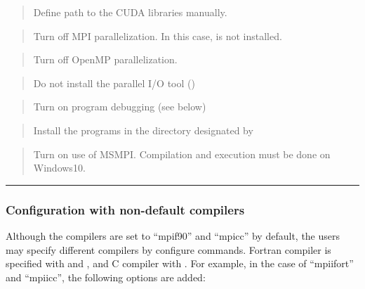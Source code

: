 \documentclass[a4paper,11pt,oneside,english]{sphinxmanual}
\begin{document}
\begin{quote}

Define path to the CUDA libraries manually.
\end{quote}

\begin{quote}

Turn off MPI parallelization. In this case,  is not installed.
\end{quote}

\begin{quote}

Turn off OpenMP parallelization.
\end{quote}

\begin{quote}

Do not install the parallel I/O tool ()
\end{quote}

\begin{quote}

Turn on program debugging (see below)
\end{quote}

\begin{quote}

Install the programs in the directory designated by 
\end{quote}

\begin{quote}

Turn on use of MSMPI. Compilation and execution must be done on Windows10.
\end{quote}


\bigskip\hrule\bigskip



\subsubsection{Configuration with non-default compilers}
\label{\detokenize{01_Getting_Started:configuration-with-non-default-compilers}}
Although the compilers are set to “mpif90” and “mpicc” by default,
the users may specify different compilers by configure commands.
Fortran compiler is specified with  and , and C compiler with .
For example, in the case of “mpiifort” and “mpiicc”, the following options are added:
\end{document}
